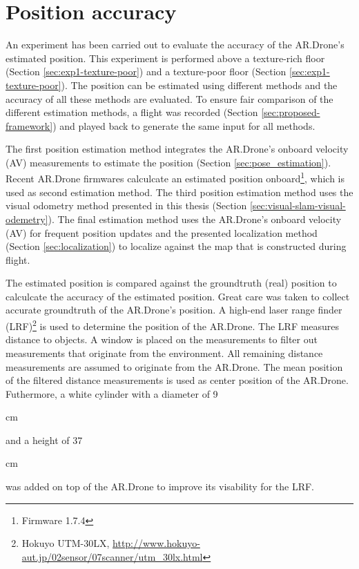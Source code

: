 \section{Position accuracy}
\label{sec:results-position-accuracy}
An experiment has been carried out to evaluate the accuracy of the AR.Drone's estimated position.
This experiment is performed above a texture-rich floor (Section \ref{sec:exp1-texture-poor}) and a texture-poor floor (Section \ref{sec:exp1-texture-poor}).
The position can be estimated using different methods and the accuracy of all these methods are evaluated.
To ensure fair comparison of the different estimation methods, a flight was recorded (Section \ref{sec:proposed-framework}) and played back to generate the same input for all methods.

The first position estimation method integrates the AR.Drone's onboard velocity (AV) measurements to estimate the position (Section \ref{sec:pose_estimation}).
Recent AR.Drone firmwares calculcate an estimated position onboard\footnote{Firmware 1.7.4}, which is used as second estimation method.
The third position estimation method uses the visual odometry method presented in this thesis (Section \ref{sec:visual-slam-visual-odemetry}).
The final estimation method uses the AR.Drone's onboard velocity (AV) for frequent position updates and the presented localization method (Section \ref{sec:localization}) to localize against the map that is constructed during flight.

The estimated position is compared against the groundtruth (real) position to calculcate the accuracy of the estimated position.
Great care was taken to collect accurate groundtruth of the AR.Drone's position.
A high-end laser range finder (LRF)\footnote{Hokuyo UTM-30LX, \url{http://www.hokuyo-aut.jp/02sensor/07scanner/utm_30lx.html}} is used to determine the position of the AR.Drone.
The LRF measures distance to objects.
A window is placed on the measurements to filter out measurements that originate from the environment.
All remaining distance measurements are assumed to originate from the AR.Drone.
The mean position of the filtered distance measurements is used as center position of the AR.Drone.
Futhermore, a white cylinder with a diameter of 9\begin{small}cm\end{small} and a height of 37\begin{small}cm\end{small} was added on top of the AR.Drone to improve its visability for the LRF.

